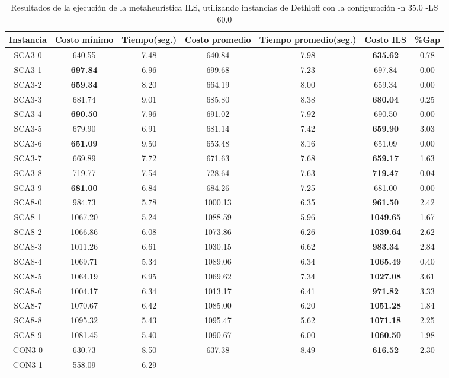 \begin{table}[ht]
\caption{Resultados de la ejecución de la metaheurística ILS, utilizando instancias de Dethloff con la configuración -n 35.0 -LS 60.0}
\centering
\small
\begin{tabular}{c c c c c c c}
\hline\hline
Instancia & Costo mínimo & Tiempo(seg.) & Costo promedio & Tiempo promedio(seg.) & Costo ILS & \%Gap \\ [0.5ex]
\hline
SCA3-0 & 640.55 & 7.48 & 
640.84 & 7.98 & \bf{635.62} & 
0.78\\SCA3-1 & \bf{697.84} & 6.96 & 
699.68 & 7.23 & 697.84 & 0.00\\
SCA3-2 & \bf{659.34} & 8.20 & 
664.19 & 8.00 & 659.34 & 0.00\\
SCA3-3 & 681.74 & 9.01 & 
685.80 & 8.38 & \bf{680.04} & 
0.25\\SCA3-4 & \bf{690.50} & 7.96 & 
691.02 & 7.92 & 690.50 & 0.00\\
SCA3-5 & 679.90 & 6.91 & 
681.14 & 7.42 & \bf{659.90} & 
3.03\\SCA3-6 & \bf{651.09} & 9.50 & 
653.48 & 8.16 & 651.09 & 0.00\\
SCA3-7 & 669.89 & 7.72 & 
671.63 & 7.68 & \bf{659.17} & 
1.63\\SCA3-8 & 719.77 & 7.54 & 
728.64 & 7.63 & \bf{719.47} & 
0.04\\SCA3-9 & \bf{681.00} & 6.84 & 
684.26 & 7.25 & 681.00 & 0.00\\
SCA8-0 & 984.73 & 5.78 & 
1000.13 & 6.35 & \bf{961.50} & 
2.42\\SCA8-1 & 1067.20 & 5.24 & 
1088.59 & 5.96 & \bf{1049.65} & 
1.67\\SCA8-2 & 1066.86 & 6.08 & 
1073.86 & 6.26 & \bf{1039.64} & 
2.62\\SCA8-3 & 1011.26 & 6.61 & 
1030.15 & 6.62 & \bf{983.34} & 
2.84\\SCA8-4 & 1069.71 & 5.34 & 
1089.06 & 6.34 & \bf{1065.49} & 
0.40\\SCA8-5 & 1064.19 & 6.95 & 
1069.62 & 7.34 & \bf{1027.08} & 
3.61\\SCA8-6 & 1004.17 & 6.34 & 
1013.17 & 6.41 & \bf{971.82} & 
3.33\\SCA8-7 & 1070.67 & 6.42 & 
1085.00 & 6.20 & \bf{1051.28} & 
1.84\\SCA8-8 & 1095.32 & 5.43 & 
1095.47 & 5.62 & \bf{1071.18} & 
2.25\\SCA8-9 & 1081.45 & 5.40 & 
1090.67 & 6.00 & \bf{1060.50} & 
1.98\\CON3-0 & 630.73 & 8.50 & 
637.38 & 8.49 & \bf{616.52} & 
2.30\\CON3-1 & 558.09 & 6.29 & 

\end{tabular}
\end{table}
